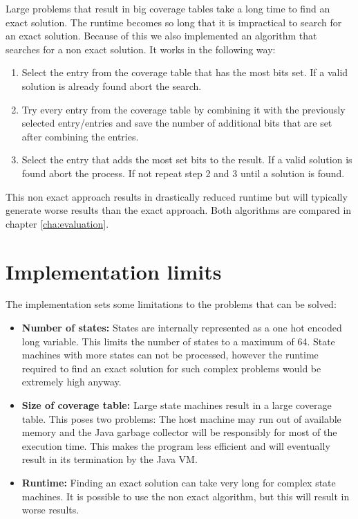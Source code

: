 Large problems that result in big coverage tables take a long time to find an exact solution. The runtime becomes so long that it is impractical to search for an exact solution. Because of this we also implemented an algorithm that searches for a non exact solution. It works in the following way:
\begin{enumerate}
\item Select the entry from the coverage table that has the most bits set. If a valid solution is already found abort the search.
\item Try every entry from the coverage table by combining it with the previously selected entry/entries and save the number of additional bits that are set after combining the entries.
\item Select the entry that adds the most set bits to the result. If a valid solution is found abort the process. If not repeat step 2 and 3 until a solution is found.
\end{enumerate}

This non exact approach results in drastically reduced runtime but will typically generate worse results than the exact approach. Both algorithms are compared in chapter \ref{cha:evaluation}.

\section{Implementation limits}

The implementation sets some limitations to the problems that can be solved:
\begin{itemize}
\item \textbf{Number of states:} States are internally represented as a one hot encoded long variable. This limits the number of states to a maximum of 64. State machines with more states can not be processed, however the runtime required to find an exact solution for such complex problems would be extremely high anyway.
\item \textbf{Size of coverage table:} Large state machines result in a large coverage table. This poses two problems: The host machine may run out of available memory and the Java garbage collector will be responsibly for most of the execution time. This makes the program less efficient and will eventually result in its termination by the Java VM.
\item \textbf{Runtime:} Finding an exact solution can take very long for complex state machines. It is possible to use the non exact algorithm, but this will result in worse results.
\end{itemize}